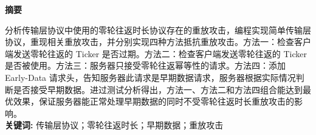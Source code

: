 \setcounter{page}{1}
\begin{center}
   \bfseries 摘\quad 要
\end{center}
\begin{spacing}{1.5}
    分析传输层协议中使用的零轮往返时长协议存在的重放攻击，编程实现简单传输层协议，重现相关重放攻击，并分别实现四种方法抵抗重放攻击。方法一：检查客户端发送零轮往返的 Ticker 是否过期。方法二：检查客户端发送零轮往返的 Ticker 是否被使用。方法三：服务器只接受零轮往返幂等性的请求。方法四：添加 Early-Data 请求头，告知服务器此请求是早期数据请求，服务器根据实际情况判断是否接受早期数据。进过测试分析得出，方法一、方法二和方法四组合能达到最优效果，保证服务器能正常处理早期数据的同时不受零轮往返时长重放攻击的影响。
    \ \\
    \textbf{关键词: }传输层协议；零轮往返时长；早期数据；重放攻击
\end{spacing}

\newpage